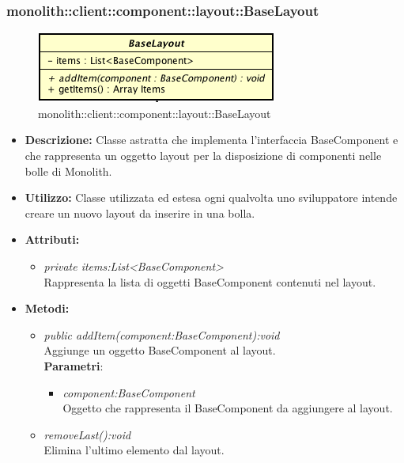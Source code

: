 \subsubsection{monolith::client::component::layout::BaseLayout}

\label{monolith::client::component::layout::BaseLayout}
\begin{figure}[ht]
	\centering
	\includegraphics[scale=0.5]{Sezioni/SottosezioniST/img/BaseLayout.png}
	\caption{monolith::client::component::layout::BaseLayout}
\end{figure}

\begin{itemize}
\item \textbf{Descrizione:} Classe astratta che implementa l'interfaccia BaseComponent e che rappresenta un oggetto layout per la disposizione di componenti nelle bolle di Monolith.
\item \textbf{Utilizzo:} Classe utilizzata ed estesa ogni qualvolta uno sviluppatore intende creare un nuovo layout da inserire in una bolla.
\item \textbf{Attributi:}
\begin{itemize}
\item \textit{private items:List<BaseComponent>}\\
Rappresenta la lista di oggetti BaseComponent contenuti nel layout.
\end{itemize}
\item \textbf{Metodi:}
\begin{itemize}
\item \textit{public addItem(component:BaseComponent):void}\\
Aggiunge un oggetto BaseComponent al layout.
\\ \textbf{Parametri}: \begin{itemize}
\item \textit{component:BaseComponent}\\
Oggetto che rappresenta il BaseComponent da aggiungere al layout.
\end{itemize}
\item \textit{removeLast():void}\\
Elimina l'ultimo elemento dal layout.
\end{itemize}
\end{itemize}

